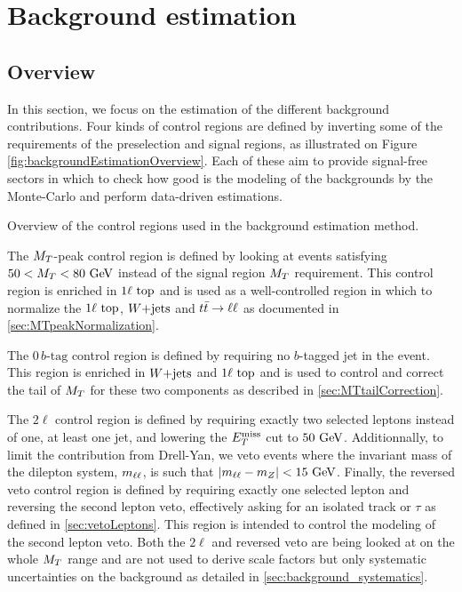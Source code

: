     \section{Background estimation \label{sec:analysis_backgroundEstimation}}

        \subsection{Overview} 

    In this section, we focus on the estimation of the different background contributions. 
    Four kinds of control regions are defined by inverting some of the requirements of the 
    preselection and signal regions, as illustrated on Figure \ref{fig:backgroundEstimationOverview}. 
    Each of these aim to provide signal-free sectors in which to check how good is the 
    modeling of the backgrounds by the Monte-Carlo and perform data-driven estimations.

                     {Overview of the control regions used in the background estimation method. }

    The $M_T$-peak control region is defined by looking at events satisfying $50 < M_T < 
    80~\text{GeV}$ instead of the signal region $M_T$ requirement. This control region is enriched 
    in $1\ell~\text{top}$ and is used as a well-controlled region in which to normalize the 
    $1\ell~\text{top}$, $\text{$W$+jets}$ and $t\bar{t} \rightarrow \ell \ell$ as documented in \ref{sec:MTpeakNormalization}.

    The $0\, b\text{-tag}$ control region is defined by requiring no $b$-tagged jet in the 
    event. This region is enriched in $\text{$W$+jets}$ and $1\ell~\text{top}$ and is used to control 
    and correct the tail of $M_T$ for these two components as described in \ref{sec:MTtailCorrection}.

    The $2\ell$ control region is defined by requiring exactly two selected leptons instead 
    of one, at least one jet, and lowering the $E_T^\text{miss}$ cut to $50 ~\text{GeV}$. Additionnally, to limit the 
    contribution from Drell-Yan, we veto events where the invariant mass of the dilepton 
    system, $m_{\ell\ell}$, is such that $\left|m_{\ell\ell} - m_{Z}\right| < 15 ~\text{GeV}$. 
    Finally, the reversed veto control region is defined by requiring exactly one selected 
    lepton and reversing the second lepton veto, effectively asking for an isolated track
    or $\tau$ as defined in \ref{sec:vetoLeptons}. This region  is intended to control 
    the modeling of the second lepton veto. Both the $2\ell$ and reversed veto are being 
    looked at on the whole $M_T$ range and are not used to derive scale factors but only  
    systematic uncertainties on the background as detailed in \ref{sec:background_systematics}.

